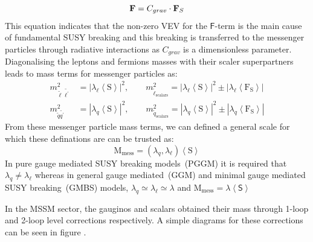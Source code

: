 {\begin{equation}{\label{eq:lt}}
\mathbf{F} = C_{grav}\cdot\mathbf{F}_{S}
\end{equation}
This equation indicates that the non-zero VEV for the $\mathsf{F}$-term is the main cause of fundamental SUSY breaking and this breaking is transferred to the messenger particles through radiative interactions as $C_{grav}$ is a dimensionless parameter.
Diagonalising the leptons and fermions masses with their scaler superpartners leads to mass terms for messenger particles as:
\begin{align}
m^{2}_{\tilde{\ell}\tilde{\ell^{\prime}}} &= |\lambda_{\ell}\left\langle \mathrm{S} \right\rangle|^{2}, \quad \quad  m^{2}_{\tilde{\ell}_{\mbox{scalars}}} = |\lambda_{\ell}\left\langle \mathrm{S} \right\rangle|^{2} \pm |\lambda_{\ell}\left\langle \mathrm{F_{S}} \right\rangle |
\\
m^{2}_{\tilde{q}\tilde{q^{\prime}}} &= |\lambda_{q}\left\langle \mathrm{S} \right\rangle|^{2}, \quad \quad  m^{2}_{\tilde{q}_{\mbox{scalars}}} = |\lambda_{q}\left\langle \mathrm{S} \right\rangle|^{2} \pm |\lambda_{q}\left\langle \mathrm{F_{S}} \right\rangle |
\end{align}
From these messenger particle mass terms, we can defined a general scale for which these definations are can be trusted as:
\begin{equation}\label{Mmess}
\mathrm{M}_{\mbox{mess}} = (\lambda_{q},\lambda_{\ell}) \left\langle \mathrm{S} \right\rangle 
\end{equation}
In pure gauge mediated SUSY breaking models~(PGGM) it is required that $\lambda_{q} \neq \lambda_{\ell}$ \cite{khoze} whereas in general gauge mediated~(GGM) and minimal gauge mediated SUSY breaking~(GMBS)\cite{gunion} models, $\lambda_{q} \simeq \lambda_{\ell} \simeq \lambda $ and $\mathrm{M}_{\mbox{mess}} = \lambda \left\langle \mathsf{S} \right\rangle $

In the MSSM sector, the gauginos and scalars obtained their mass through 1-loop and 2-loop level corrections respectively.
A simple diagrams for these corrections can be seen in figure \label{figMass}.

}
